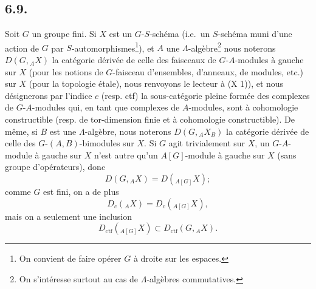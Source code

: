 \subsection*{6.9.}
Soit $G$ un groupe fini. Si $X$ est un $G$-$S$-schéma (i.e.~un $S$-schéma muni d'une action de $G$ par $S$-automorphismes\footnote{On convient de faire opérer $G$ à droite sur les espaces.}), et $A$ une $\Lambda$-algèbre\footnote{On s'intéresse surtout au cas de $\Lambda$-algèbres commutatives.} nous noterons $D(G,{}_AX)$ la catégorie dérivée de celle des faisceaux de $G$-$A$-modules à gauche sur $X$ (pour les notions de $G$-faisceau d'ensembles, d'anneaux, de modules, etc.) sur $X$ (pour la topologie étale), nous renvoyons le lecteur à (X 1)), et nous
désignerons par l'indice $c$ (resp. ctf) la sous-catégorie pleine formée des complexes de $G$-$A$-modules qui, en tant que complexes de $A$-modules, sont à cohomologie constructible (resp. de tor-dimension finie et à cohomologie constructible). De même, si $B$ est une $\Lambda$-algèbre, nous noterons $D(G,{}_AX_B)$ la catégorie dérivée de celle des $G$-$(A,B)$-bimodules sur $X$. Si $G$ agit trivialement sur $X$, un $G$-$A$-module à gauche sur $X$ n'est autre qu'un $A[G]$-module à gauche sur $X$ (sans groupe d'opérateurs), donc
\[
D(G,{}_AX)=D({}_{A[G]}X);
\]
comme $G$ est fini, on a de plus
\[
D_c({}_AX)=D_c({}_{A[G]}X),
\]
mais on a seulement une inclusion
\[
D_{\mathrm{ctf}}({}_{A[G]}X)\subset D_{\mathrm{ctf}}(G,{}_AX).
\]


